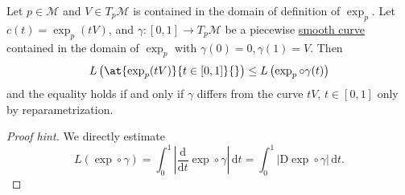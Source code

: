 \begin{corollary}\label{col:lec18}
	Let \(p\in \mathcal{M} \) and \(V\in T_p \mathcal{M} \) is contained in the domain of definition of \(\exp _p\). Let \(c(t) = \exp _p(t V)\), and \(\gamma \colon [0, 1] \to T_p \mathcal{M} \) be a piecewise \hyperref[def:curve]{smooth curve}  contained in the domain of \(\exp _p\) with \(\gamma (0) = 0, \gamma (1) = V\). Then
	\[
		L \left( \at{\exp _p(tV)}{t\in[0, 1]}{}  \right)
		\leq L \left( \exp _p \circ \gamma (t) \right)
	\]
	and the equality holds if and only if \(\gamma \) differs from the curve \(tV\), \(t\in[0, 1]\) only by reparametrization.
\end{corollary}
\begin{proof}[Proof hint]
	We directly estimate
	\[
		L(\exp \circ \gamma )
		= \int_{0}^{1} \left\vert \frac{\mathrm{d}}{\mathrm{d}t} \exp \circ \gamma \right\vert \,\mathrm{d}t
		= \int_{0}^{1} \vert \mathrm{D} \exp \circ \gamma  \vert  \,\mathrm{d}t.
	\]
\end{proof}
